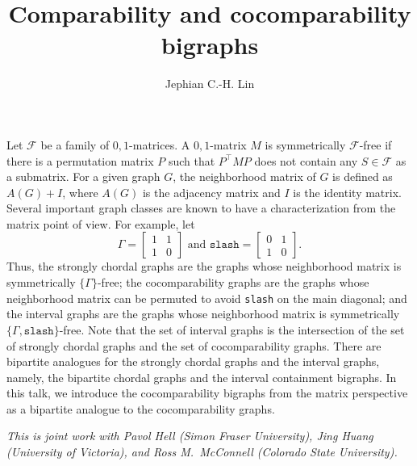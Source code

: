 \documentclass[a4paper]{amsart}
\date{}
\begin{document}
\title{Comparability and cocomparability bigraphs}
\author{Jephian C.-H. Lin} %
\address{National Sun Yat-sen University} %

\maketitle


Let $\mathcal{F}$ be a family of $0,1$-matrices.  A $0,1$-matrix $M$ is symmetrically $\mathcal{F}$-free if there is a permutation matrix $P$ such that $P^\top MP$ does not contain any $S\in\mathcal{F}$ as a submatrix.  For a given graph $G$, the neighborhood matrix of $G$ is defined as $A(G)+I$, where $A(G)$ is the adjacency matrix and $I$ is the identity matrix.  Several important graph classes are known to have a characterization from the matrix point of view.  For example, let
\[\Gamma=\begin{bmatrix}1&1\\1&0\end{bmatrix}\text{ and }\texttt{slash}=\begin{bmatrix}0&1\\1&0\end{bmatrix}.\]
Thus, the strongly chordal graphs are the graphs whose neighborhood matrix is symmetrically $\{\Gamma\}$-free; the cocomparability graphs are the graphs whose neighborhood matrix can be permuted to avoid \texttt{slash} on the main diagonal; and the interval graphs are the graphs whose neighborhood matrix is symmetrically $\{\Gamma,\mathtt{slash}\}$-free.  Note that the set of interval graphs is the intersection of the set of strongly chordal graphs and the set of cocomparability graphs.  There are bipartite analogues for the strongly chordal graphs and the interval graphs, namely, the bipartite chordal graphs and the interval containment bigraphs.  In this talk, we introduce the cocomparability bigraphs from the matrix perspective as a bipartite analogue to the cocomparability graphs.

\emph{This is joint work with Pavol Hell (Simon Fraser University), Jing Huang (University of Victoria), and Ross M.~McConnell (Colorado State University).
}
\end{document}
